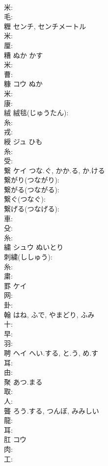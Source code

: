 \documentclass[8pt]{extreport}
\begin{document}
\begin{CJK}{UTF8}{min}
\\	米: 
\\	毛: 
\\	糎		センチ, センチメートル				
\\	米: 
\\	厘: 
\\	糟		ぬか	かす			
\\	米: 
\\	曹: 
\\	糠	コウ	ぬか		
\\	米: 
\\	康: 
\\	絨					絨毯(じゅうたん): 
\\	糸: 
\\	戎: 
\\	綬	ジュ	ひも		
\\	糸: 
\\	受: 
\\	繋	ケイ	つな.ぐ, かか.る, か.ける		
\\	繋がり(つながり): 
\\	繋がる(つながる): 
\\	繋ぐ(つなぐ): 
\\	繋げる(つなげる): 
\\	車: 
\\	殳: 
\\	糸: 
\\	繍	シュウ	ぬいとり		
\\	刺繍(ししゅう): 
\\	糸: 
\\	粛: 
\\	罫	ケイ			
\\	网: 
\\	卦: 
\\	翰		はね, ふで, やまどり, ふみ				
\\	十: 
\\	早: 
\\	羽: 
\\	聘	ヘイ	へい.する, と.う, め.す		
\\	耳: 
\\	由: 
\\	聚		あつ.まる				
\\	取: 
\\	人: 
\\	聾		ろう.する, つんぼ, みみしい				
\\	龍: 
\\	耳: 
\\	肛	コウ			
\\	肉: 
\\	工: 

\end{CJK}
\end{document}
